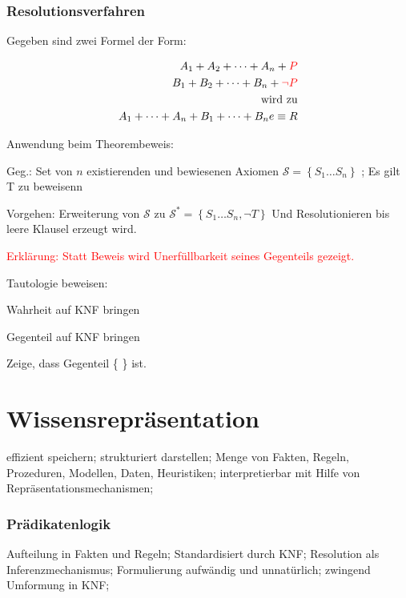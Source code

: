 \documentclass[german,color,6pt]{latex4ei/latex4ei_sheet}
\begin{document}
\begin{sectionbox}
\subsubsection{Resolutionsverfahren}
Gegeben sind zwei Formel der Form:

\begin{equation*}
\begin{split}
	A_1 + A_2 + \dots + A_n + \textcolor{red}{ P } \\
	B_1 + B_2 + \dots + B_n + \textcolor{red}{ \neg P } \\
	\text{wird zu} \\
	A_1 + \dots  + A_n + B_1 + \dots +  B_n e\equiv R
\end{split}
\end{equation*}

Anwendung beim Theorembeweis:

Geg.: Set von $n$ existierenden und bewiesenen Axiomen $\mathcal S = \left\{S_1 \dots S_n \right\}$ ; Es gilt T zu beweisenn

Vorgehen: Erweiterung von $\mathcal S $ zu $\mathcal S^* = \left\{S_1 \dots S_n , \neg T \right\}$ Und Resolutionieren bis leere Klausel erzeugt wird.

\textcolor{red}{Erklärung: Statt Beweis wird Unerfüllbarkeit seines Gegenteils gezeigt. }

\begin{cookbox}{Tautologie beweisen: }
	\item Wahrheit auf KNF bringen
	\item Gegenteil auf KNF bringen
	\item Zeige, dass Gegenteil \{ \} ist.
\end{cookbox}
\end{sectionbox}

\section{Wissensrepräsentation}
\begin{symbolbox}
effizient speichern; strukturiert darstellen; Menge von Fakten, Regeln, Prozeduren, Modellen, Daten, Heuristiken; interpretierbar mit Hilfe von Repräsentationsmechanismen;
\end{symbolbox}

\begin{sectionbox}
\subsubsection{Prädikatenlogik}
Aufteilung in Fakten und Regeln; Standardisiert durch KNF; Resolution als Inferenzmechanismus; Formulierung aufwändig und unnatürlich; zwingend Umformung in KNF;
\end{sectionbox}
\end{document}
